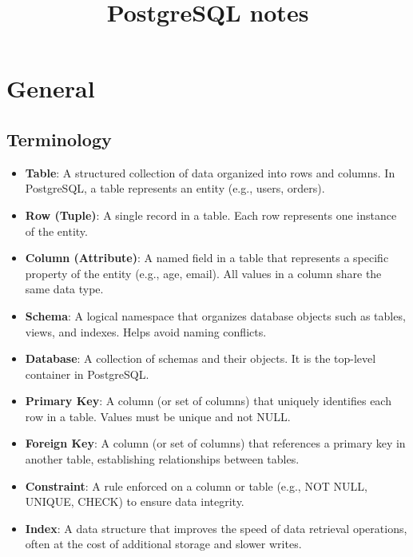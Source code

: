 \documentclass[10pt]{article}
\title{PostgreSQL notes}
\author{}
\date{}
\newcommand{\newbp}{%
  \newpage
  \mbox{}
  \newpage
}
\begin{document}
\maketitle

\tableofcontents

\newbp
\section{General}

\subsection{Terminology}

\begin{itemize}
\item \textbf{Table}: A structured collection of data organized into rows and columns. In PostgreSQL, a table represents an entity (e.g., users, orders).

\item \textbf{Row (Tuple)}: A single record in a table. Each row represents one instance of the entity.

\item \textbf{Column (Attribute)}: A named field in a table that represents a specific property of the entity (e.g., age, email). All values in a column share the same data type.

\item \textbf{Schema}: A logical namespace that organizes database objects such as tables, views, and indexes. Helps avoid naming conflicts.

\item \textbf{Database}: A collection of schemas and their objects. It is the top-level container in PostgreSQL.

\item \textbf{Primary Key}: A column (or set of columns) that uniquely identifies each row in a table. Values must be unique and not NULL.

\item \textbf{Foreign Key}: A column (or set of columns) that references a primary key in another table, establishing relationships between tables.

\item \textbf{Constraint}: A rule enforced on a column or table (e.g., NOT NULL, UNIQUE, CHECK) to ensure data integrity.

\item \textbf{Index}: A data structure that improves the speed of data retrieval operations, often at the cost of additional storage and slower writes.


\end{itemize}
\end{document}

